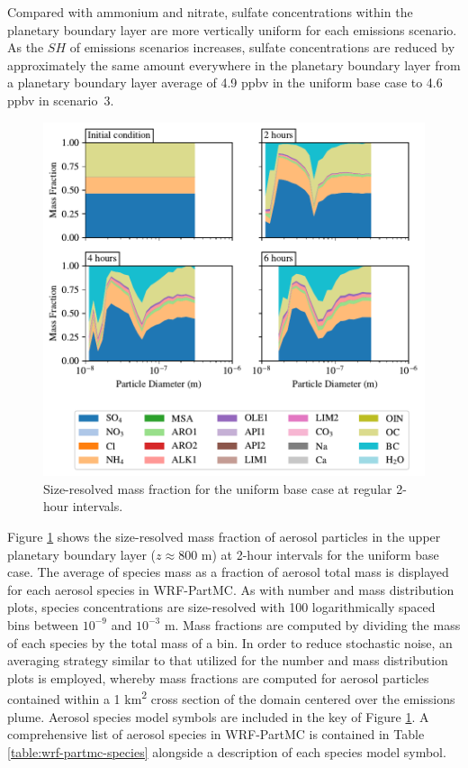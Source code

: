 Compared with ammonium and nitrate, sulfate concentrations within the planetary boundary layer are more vertically uniform for each emissions scenario. As the $SH$ of emissions scenarios increases, sulfate concentrations are reduced by approximately the same amount everywhere in the planetary boundary layer from a planetary boundary layer average of 4.9 ppbv in the uniform base case to 4.6 ppbv in scenario~3. 

\begin{figure}[!t]
  \centering
    \includegraphics[width=\textwidth]{figures/chapter5/speciated-mass-frac-four-panel-uniform-basecase-z40.pdf}
    \caption{Size-resolved mass fraction for the uniform base case at regular 2-hour intervals.}
    \label{fig:mass-frac-ub}
\end{figure}

Figure \ref{fig:mass-frac-ub} shows the size-resolved mass fraction of aerosol particles in the upper planetary boundary layer ($z\approx800$ m) at 2-hour intervals for the uniform base case. The average of species mass as a fraction of aerosol total mass is displayed for each aerosol species in WRF-PartMC. As with number and mass distribution plots, species concentrations are size-resolved with 100 logarithmically spaced bins between $10^{-9}$ and $10^{-3}$ m. Mass fractions are computed by dividing the mass of each species by the total mass of a bin. In order to reduce stochastic noise, an averaging strategy similar to that utilized for the number and mass distribution plots is employed, whereby mass fractions are computed for aerosol particles contained within a 1 \si{km^2} cross section of the domain centered over the emissions plume. Aerosol species model symbols are included in the key of Figure \ref{fig:mass-frac-ub}. A comprehensive list of aerosol species in WRF-PartMC is contained in Table \ref{table:wrf-partmc-species} alongside a description of each species model symbol. 

